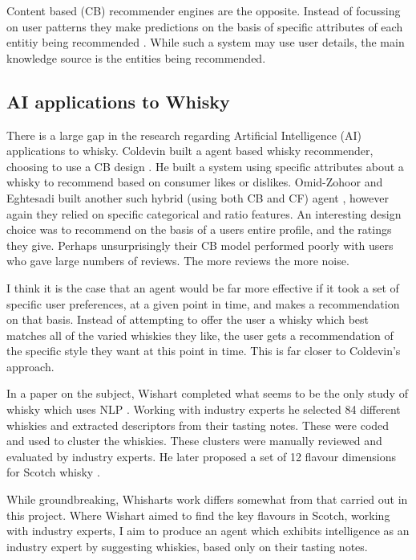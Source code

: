 Content based (CB) recommender engines are the opposite.  Instead of focussing on user patterns they make predictions
on the basis of specific attributes of each entitiy being recommended \cite{Melville2010, Mooney2000}.  While such a 
system may use user details, the main knowledge source is the entities being recommended.

\subsection{AI applications to Whisky}\label{ssec:ml2whisk}

There is a large gap in the research regarding Artificial Intelligence (AI) applications to whisky.
Coldevin built a agent based whisky recommender, choosing to use a CB design \cite{Coldevin2005}.  He 
built a system using specific attributes about a whisky to recommend based
on consumer likes or dislikes. Omid-Zohoor and Eghtesadi built another such hybrid (using both CB and CF) 
agent \cite{Omidzohoor}, however again they relied on specific categorical and ratio features.
An interesting design choice was to recommend on the basis of a users entire profile, and the 
ratings they give.  Perhaps unsurprisingly their CB model performed poorly with users who gave large 
numbers of reviews. The more reviews the more noise.

I think it is the case that an agent would be far more effective if it took a set of specific user preferences,
at a given point in time, and makes a recommendation on that basis.  Instead of attempting
to offer the user a whisky which best matches all of the varied whiskies they like, the user gets
a recommendation of the specific style they want at this point in time.  This is far 
closer to Coldevin's approach.

In a paper on the subject, Wishart completed what seems to be the only study of whisky which uses NLP \cite{Wishart2000}.
Working with industry experts he selected 84 different whiskies and extracted descriptors from their tasting notes. 
These were coded and used to cluster the whiskies. These clusters were manually reviewed and evaluated by 
industry experts.  He later proposed a set of 12 flavour dimensions for Scotch whisky \cite{Wishart2009}.

While groundbreaking, Whisharts work differs somewhat from that carried out in this project.  Where Wishart aimed to find
the key flavours in Scotch, working with industry experts, I aim to produce an agent which exhibits intelligence as an 
industry expert by suggesting whiskies, based only on their tasting notes.

